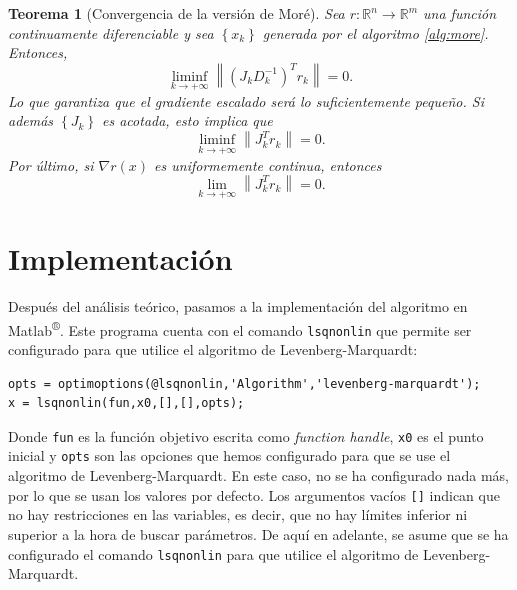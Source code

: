 \documentclass[11pt,a4paper]{book}
\newtheorem{theorem}{Teorema}[chapter]
\theoremstyle{definition}
\theoremstyle{remark}
\newcommand{\norm}[1]{\left\lVert#1\right\rVert}
\newcommand{\sucesionxk}{\left\{x_k\right\}}
\newcommand{\sucesion}[1]{\left\{#1\right\}}
\def\code#1{\texttt{#1}}
\begin{document}
\begin{theorem}[Convergencia de la versión de Moré]\label{th:more}
	Sea $r:\mathbb{R}^n \to \mathbb{R}^m$ una función continuamente diferenciable y
	sea $\sucesionxk$ generada por el algoritmo \ref{alg:more}. Entonces,
	\begin{equation}
		\liminf_{k\to +\infty} \norm{(J_kD_k^{-1})^Tr_k} = 0.
	\end{equation}
	Lo que garantiza que el gradiente escalado será lo suficientemente pequeño.
	Si además $\sucesion{J_k}$ es acotada, esto implica que
	\begin{equation}
		\liminf_{k\to +\infty} \norm{J_k^Tr_k} = 0.
	\end{equation}
	Por último, si $\nabla r(x)$ es uniformemente continua, entonces
	\begin{equation}
		\lim_{k\to +\infty} \norm{J_k^Tr_k} = 0.
	\end{equation}
\end{theorem}

\chapter{Implementación}

Después del análisis teórico, pasamos a la implementación del algoritmo en Matlab\textsuperscript{®}.
Este programa cuenta con el comando \code{lsqnonlin} \cite{lsqnonlin} que permite ser
configurado para que utilice el algoritmo de Levenberg-Marquardt:

\begin{lstlisting}[style=Matlab-editor]
opts = optimoptions(@lsqnonlin,'Algorithm','levenberg-marquardt');
x = lsqnonlin(fun,x0,[],[],opts);
\end{lstlisting}
Donde \code{fun} es la función objetivo escrita como \textit{function handle}, \code{x0} es el punto inicial y \code{opts} son las opciones que hemos configurado para que se use el algoritmo de Levenberg-Marquardt. En este caso, no se ha configurado nada más, por lo que se usan los valores por defecto. Los argumentos vacíos \code{[]} indican que no hay restricciones en las variables, es decir, que no hay límites inferior ni superior a la hora de buscar parámetros. De aquí en adelante, se asume que se ha configurado el comando \code{lsqnonlin} para que utilice el algoritmo de Levenberg-Marquardt.
\end{document}
